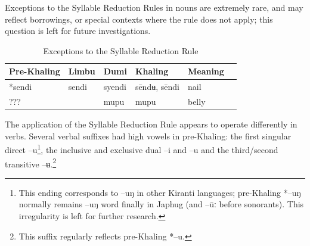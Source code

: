 \documentclass[oldfontcommands,oneside,a4paper,11pt]{article}
\newcommand{\ipa}[1]{{\phon \mbox{#1}}} %
\begin{document}
Exceptions to the Syllable Reduction Rules in nouns are extremely rare, and may reflect borrowings, or special contexts where the rule does not apply; this question is left for future investigations.

\begin{table}[h]
\caption{Exceptions to the Syllable Reduction Rule} \centering \label{tab:non.reduction}
\begin{tabular}{llllll}
\toprule
Pre-Khaling	&Limbu	&Dumi	&Khaling	&Meaning\\
\midrule
\ipa{*sendi}			&\ipa{sendi}&	\ipa{syendi}	&	\ipa{sēndʉ}, \ipa{sēndi}	&	nail \\
 	???& &	\ipa{mupu}	&	  \ipa{mupu}	&	belly \\
\bottomrule
\end{tabular}
\end{table}

The application of the Syllable Reduction Rule appears to operate differently in verbs. Several verbal suffixes had high vowels in pre-Khaling: the first singular direct \ipa{--u}\footnote{This ending corresponds to \ipa{--uŋ} in other Kiranti languages; pre-Khaling \ipa{*--uŋ} normally remains \ipa{--uŋ} word finally in Japhug (and \ipa{--ūː} before sonorants). This irregularity is left for further research.}, the inclusive and exclusive dual --\ipa{i} and --\ipa{u} and the third/second transitive \ipa{--ʉ}.\footnote{This suffix regularly reflects pre-Khaling \ipa{*--u}.}
\end{document}
